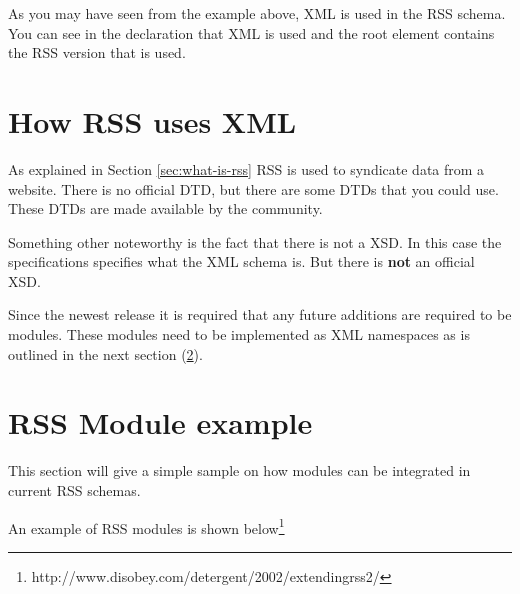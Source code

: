 

As you may have seen from the example above, XML is used in the RSS schema. You can see in the declaration that XML is used and the root element contains the RSS version that is used.

\section{How RSS uses XML}
As explained in Section \ref{sec:what-is-rss} RSS is used to syndicate data from a website. There is no official DTD, but there are some DTDs that you could use. These DTDs are made available by the community.

Something other noteworthy is the fact that there is not a XSD. In this case the specifications specifies what the XML schema is. But there is \textbf{not} an official XSD.

Since the newest release it is required that any future additions are required to be modules. These modules need to be implemented as XML namespaces as is outlined in the next section (\ref{sec:rss-module-example}).

\section{RSS Module example}
\label{sec:rss-module-example}
This section will give a simple sample on how modules can be integrated in current RSS schemas.

An example of RSS modules is shown below\footnote{http://www.disobey.com/detergent/2002/extendingrss2/}


